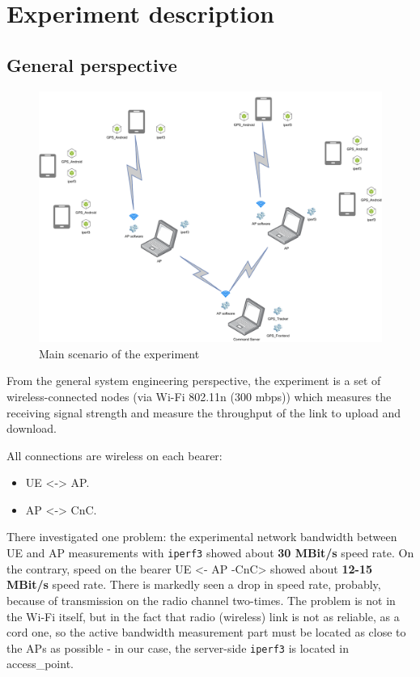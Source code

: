 
\section{Experiment description}\label{experiment-description}

\subsection{General perspective}\label{general-perspective}

\begin{figure}[H]
\centering
\includegraphics[width=\linewidth,keepaspectratio]{images/Deployment Diagram-Free-structure_scheme.pdf}
\caption{Main scenario of the experiment}
\label{fig:experiment-overall-layout}
\end{figure}

From the general system engineering perspective, the experiment is a set
of wireless-connected nodes (via Wi-Fi 802.11n (300 mbps)) which measures the receiving signal strength and measure the throughput of the link to upload and download.

All connections are wireless on each bearer:

\begin{itemize}
\tightlist
\item
  UE \textless{}-\textgreater{} AP.
\item
  AP \textless{}-\textgreater{} CnC.
\end{itemize}

There investigated one problem: the experimental network bandwidth
between UE and AP measurements with \texttt{iperf3} showed about
\textbf{30 MBit/s} speed rate. On the contrary, speed on the bearer UE \textless{}- AP -CnC\textgreater{} showed about \textbf{12-15 MBit/s} speed rate. There is markedly seen a drop in speed rate, probably, because of transmission on the radio channel two-times. The problem  is not in the Wi-Fi itself, but in the fact that radio (wireless) link is not as reliable, as a cord one, so the active bandwidth measurement part must be located as close to the APs as possible - in our case, the server-side \texttt{iperf3} is located in \gls{access_point}.

